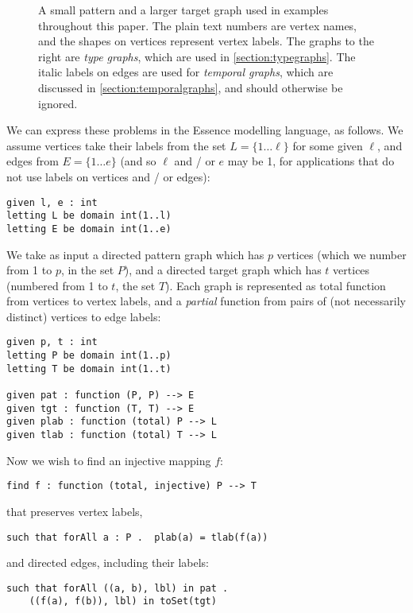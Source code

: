 \documentclass[runningheads]{llncs}
\begin{document}
\begin{figure}[tb]
    \caption{A small pattern and a larger target graph used in examples throughout this paper. The
    plain text numbers are vertex names, and the shapes on vertices represent vertex labels. The
    graphs to the right are \emph{type graphs}, which are used in \cref{section:typegraphs}. The
    italic labels on edges are used for \emph{temporal graphs}, which are discussed in
    \cref{section:temporalgraphs}, and should otherwise be ignored.}
    \label{figure:littlegraphs}
\end{figure}

We can express these problems in the Essence modelling language, as follows. We assume
vertices take their labels from the set $L = \{ 1\ldots\ell \}$ for some given $\ell$, and edges
from $E = \{ 1\ldots{}e \}$ (and so $\ell$ and / or $e$ may be 1, for applications that do not use
labels on vertices and / or edges):
\begin{lstlisting}
given l, e : int
letting L be domain int(1..l)
letting E be domain int(1..e)
\end{lstlisting}
We take as input a directed pattern graph which has $p$ vertices (which we number from 1 to $p$, in
the set $P$), and a directed target graph which has $t$ vertices (numbered from 1 to $t$, the set
$T$). Each graph is represented as total function from vertices to vertex labels, and a
\emph{partial} function from pairs of (not necessarily distinct) vertices to edge labels:
\begin{lstlisting}
given p, t : int
letting P be domain int(1..p)
letting T be domain int(1..t)

given pat : function (P, P) --> E
given tgt : function (T, T) --> E
given plab : function (total) P --> L
given tlab : function (total) T --> L
\end{lstlisting}
Now we wish to find an injective mapping $f$:
\begin{lstlisting}
find f : function (total, injective) P --> T
\end{lstlisting}
that preserves vertex labels,
\begin{lstlisting}
such that forAll a : P .  plab(a) = tlab(f(a))
\end{lstlisting}
and directed edges, including their labels:
\begin{lstlisting}
such that forAll ((a, b), lbl) in pat .
    ((f(a), f(b)), lbl) in toSet(tgt)
\end{lstlisting}
\end{document}
